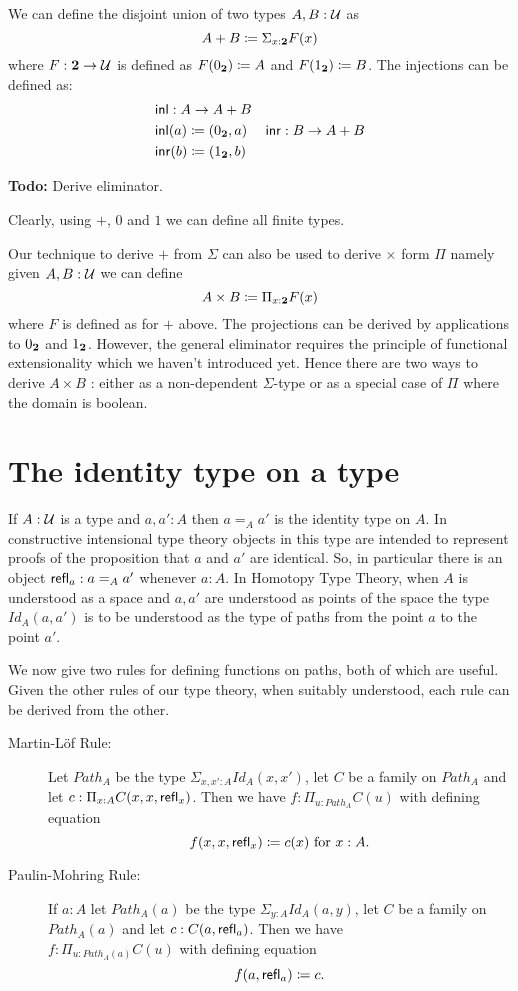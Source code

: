 We can define the disjoint union of two types $A,B:\mathcal{U}$ as
\[A + B \coloneqq \Sigma_{x:\mathbf{2}}F(x)\]
where $F : \mathbf{2} \to \mathcal{U}$ is
defined as $F(0_\mathbf{2}) \coloneqq A$ and $F(1_\mathbf{2})\coloneqq B$. The
injections can be defined as:
\begin{align*}
& \mathsf{inl} :  A \to A+B\\
& \mathsf{inl}(a) \coloneqq (0_\mathbf{2},a)
& \mathsf{inr} :  B \to A+B\\
& \mathsf{inr}(b) \coloneqq (1_\mathbf{2},b)
\end{align*}

\textbf{Todo:} Derive eliminator.

Clearly, using $+$, $0$ and $1$ we can define all finite types.

Our technique to derive $+$ from $\Sigma$ can also be used to derive
$\times$ form $\Pi$ namely given $A,B:\mathcal{U}$ we can define 
\[ A \times B \coloneqq \Pi_{x:\mathbf{2}}F(x)\]
where $F$ is defined as for $+$ above. The projections can be derived
by applications to $0_\mathbf{2}$ and $1_\mathbf{2}$. However, the general
eliminator requires the principle of functional extensionality which
we haven't introduced yet. Hence there are two ways to derive $A\times
B$ : either as a non-dependent $\Sigma$-type or as a special case of
$\Pi$ where the domain is boolean. 

\section{The identity type on a type}
\label{sec:identity-types}

If $A:\mathcal{U}$ is a type and $a,a':A$ then $a =_A a'$ is the identity type on $A$.  
In constructive intensional type theory objects in this type are
intended to represent proofs of the proposition that $a$ and $a'$ are
identical.  So, in particular there is an object $\mathsf{refl}_{a}: a =_A a'$ whenever $a:A$.  In Homotopy Type Theory, when $A$ is understood as a space and $a,a'$ are understood as points of the space the type $Id_A(a,a')$ is to be understood as the type of paths from the point $a$ to the point $a'$.

We now give two rules for defining functions on paths, both of which are useful.  Given the other rules of our type theory, when suitably understood, each rule can be derived from the other. 

\begin{description}
\item[Martin-L\"{o}f Rule:] Let $Path_A$ be the type $\Sigma_{x,x':A}Id_A(x,x')$, let $C$ be a family on $Path_A$ and let $c:\Pi_{x:A}C(x,x,\mathsf{refl}_{x})$.  Then we have $f:\Pi_{u:Path_A}C(u)$ with defining equation
  \[ f(x,x,\mathsf{refl}_{x})\coloneqq c(x)\mbox{ for } x:A.\]
\item[Paulin-Mohring Rule:] If $a:A$ let $Path_A(a)$ be the type $\Sigma_{y:A}Id_A(a,y)$, let $C$ be a family on $Path_A(a)$ and let $c:C(a,\mathsf{refl}_{a})$. Then we have\\ $f:\Pi_{u:Path_A(a)}C(u)$ with defining equation
    \[ f(a,\mathsf{refl}_{a})\coloneqq c.\]
\end{description}

